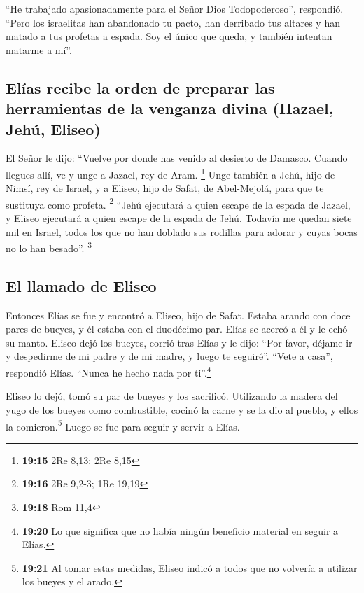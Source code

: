  ``He trabajado apasionadamente para el Señor Dios
Todopoderoso'', respondió. ``Pero los israelitas han abandonado tu
pacto, han derribado tus altares y han matado a tus profetas a espada.
Soy el único que queda, y también intentan matarme a mí''.

\hypertarget{eluxedas-recibe-la-orden-de-preparar-las-herramientas-de-la-venganza-divina-hazael-jehuxfa-eliseo}{%
\subsection{Elías recibe la orden de preparar las herramientas de la
venganza divina (Hazael, Jehú,
Eliseo)}\label{eluxedas-recibe-la-orden-de-preparar-las-herramientas-de-la-venganza-divina-hazael-jehuxfa-eliseo}}

 El Señor le dijo: ``Vuelve por donde has venido al
desierto de Damasco. Cuando llegues allí, ve y unge a Jazael, rey de
Aram. \footnote{\textbf{19:15} 2Re 8,13; 2Re 8,15}  Unge
también a Jehú, hijo de Nimsí, rey de Israel, y a Eliseo, hijo de Safat,
de Abel-Mejolá, para que te sustituya como profeta. \footnote{\textbf{19:16}
  2Re 9,2-3; 1Re 19,19}  ``Jehú ejecutará a quien escape
de la espada de Jazael, y Eliseo ejecutará a quien escape de la espada
de Jehú.  Todavía me quedan siete mil en Israel, todos
los que no han doblado sus rodillas para adorar y cuyas bocas no lo han
besado''. \footnote{\textbf{19:18} Rom 11,4}

\hypertarget{el-llamado-de-eliseo}{%
\subsection{El llamado de Eliseo}\label{el-llamado-de-eliseo}}

 Entonces Elías se fue y encontró a Eliseo, hijo de
Safat. Estaba arando con doce pares de bueyes, y él estaba con el
duodécimo par. Elías se acercó a él y le echó su manto. 
Eliseo dejó los bueyes, corrió tras Elías y le dijo: ``Por favor, déjame
ir y despedirme de mi padre y de mi madre, y luego te seguiré''. ``Vete
a casa'', respondió Elías. ``Nunca he hecho nada por ti''.\footnote{\textbf{19:20}
  Lo que significa que no había ningún beneficio material en seguir a
  Elías.}

 Eliseo lo dejó, tomó su par de bueyes y los sacrificó.
Utilizando la madera del yugo de los bueyes como combustible, cocinó la
carne y se la dio al pueblo, y ellos la comieron.\footnote{\textbf{19:21}
  Al tomar estas medidas, Eliseo indicó a todos que no volvería a
  utilizar los bueyes y el arado.} Luego se fue para seguir y servir a
Elías.

